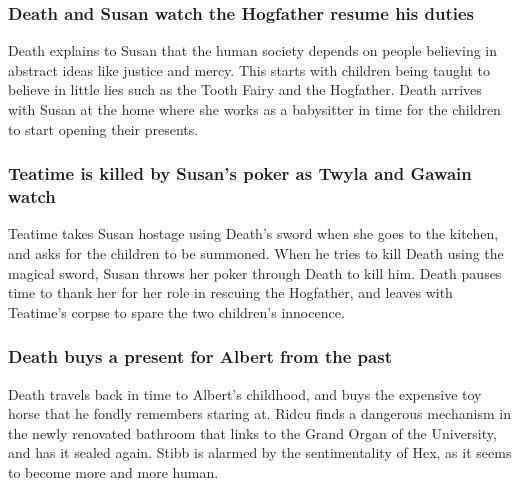 \subsubsection{\Gls{Death} and \Gls{Susan} watch the Hogfather resume his duties}
\Gls{Death} explains to \Gls{Susan} that the human society depends on people believing in abstract
ideas like justice and mercy. This starts with children being taught to believe in little lies such
as the Tooth Fairy and the Hogfather. \Gls{Death} arrives with \Gls{Susan} at the home where she
works as a babysitter in time for the children to start opening their presents.

\subsubsection{\Gls{Teatime} is killed by \Gls{Susan}'s poker as \Gls{Twyla} and \Gls{Gawain} watch}
\Gls{Teatime} takes \Gls{Susan} hostage using \Gls{Death}'s sword when she goes to the kitchen, and
asks for the children to be summoned. When he tries to kill \Gls{Death} using the magical sword,
\Gls{Susan} throws her poker through \Gls{Death} to kill him. \Gls{Death} pauses time to thank her
for her role in rescuing the Hogfather, and leaves with \Gls{Teatime}'s corpse to spare the two
children's innocence.

\subsubsection{\Gls{Death} buys a present for \Gls{Albert} from the past}
\Gls{Death} travels back in time to \Gls{Albert}'s childhood, and buys the expensive toy horse that
he fondly remembers staring at. \Gls{Ridcu} finds a dangerous mechanism in the newly renovated
bathroom that links to the Grand Organ of the University, and has it sealed again. \Gls{Stibb} is
alarmed by the sentimentality of \Gls{Hex}, as it seems to become more and more human.